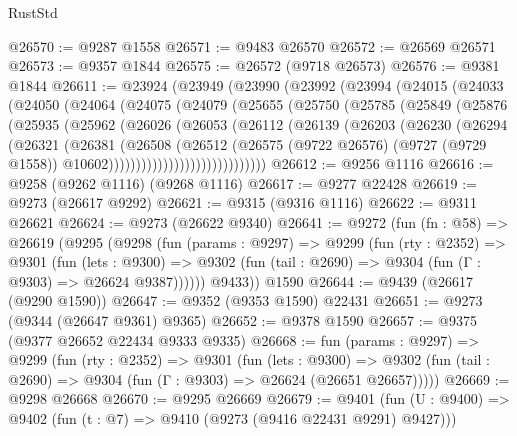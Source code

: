 \begin{lexlean}{RustStd}
\begin{coremodule}
@26570 := @9287 @1558
@26571 := @9483 @26570
@26572 := @26569 @26571
@26573 := @9357 @1844
@26575 := @26572 (@9718 @26573)
@26576 := @9381 @1844
@26611 := @23924
    (@23949
      (@23990
        (@23992
          (@23994
            (@24015
              (@24033
                (@24050
                  (@24064
                    (@24075
                      (@24079
                        (@25655
                          (@25750
                            (@25785
                              (@25849
                                (@25876
                                  (@25935
                                    (@25962
                                      (@26026
                                        (@26053
                                          (@26112
                                            (@26139
                                              (@26203
                                                (@26230
                                                  (@26294
                                                    (@26321
                                                      (@26381
                                                        (@26508
                                                          (@26512
                                                            (@26575
                                                              (@9722 @26576)
                                                              (@9727 (@9729 @1558))
                                                              @10602)))))))))))))))))))))))))))))
@26612 := @9256 @1116
@26616 := @9258 (@9262 @1116) (@9268 @1116)
@26617 := @9277 @22428
@26619 := @9273 (@26617 @9292)
@26621 := @9315 (@9316 @1116)
@26622 := @9311 @26621
@26624 := @9273 (@26622 @9340)
@26641 := @9272
    (fun (fn : @58) =>
    @26619
      (@9295
        (@9298
          (fun (params : @9297) =>
          @9299
            (fun (rty : @2352) =>
            @9301
              (fun (lets : @9300) =>
              @9302 (fun (tail : @2690) => @9304 (fun (Γ : @9303) => @26624 @9387))))))
        @9433))
    @1590
@26644 := @9439 (@26617 (@9290 @1590))
@26647 := @9352 (@9353 @1590) @22431
@26651 := @9273 (@9344 (@26647 @9361) @9365)
@26652 := @9378 @1590
@26657 := @9375 (@9377 @26652 @22434 @9333 @9335)
@26668 := fun (params : @9297) =>
  @9299
    (fun (rty : @2352) =>
    @9301
      (fun (lets : @9300) =>
      @9302 (fun (tail : @2690) => @9304 (fun (Γ : @9303) => @26624 (@26651 @26657)))))
@26669 := @9298 @26668
@26670 := @9295 @26669
@26679 := @9401
    (fun (U : @9400) => @9402 (fun (t : @7) => @9410 (@9273 (@9416 @22431 @9291) @9427)))

\end{coremodule}
\end{lexlean}
